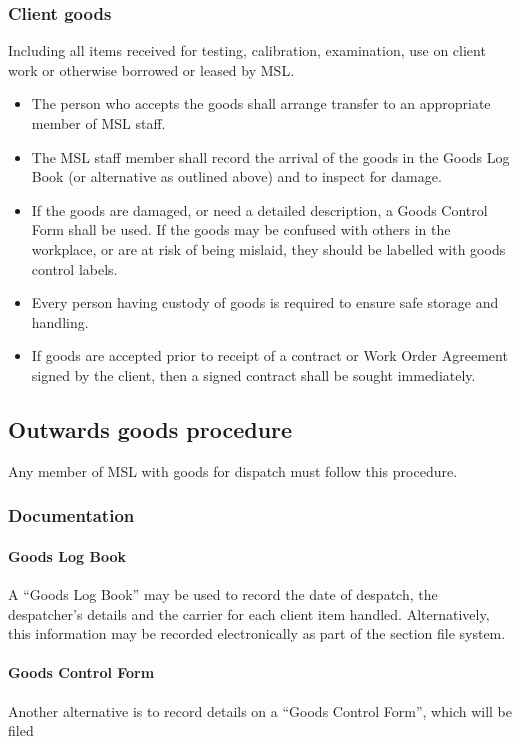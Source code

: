 \subsubsection{Client goods}
Including all items received for testing, calibration, examination, use on client work or otherwise borrowed or leased by MSL. 
\begin{itemize}
\item The person who accepts the goods shall arrange transfer to an appropriate member of MSL staff.
\item The MSL staff member shall record the arrival of the goods in the Goods Log Book (or alternative as outlined above) and to inspect for damage.
\item If the goods are damaged, or need a detailed description, a Goods Control Form shall be used. If the goods may be confused with others in the workplace, or are at risk of being mislaid, they should be labelled with goods control labels. 
\item Every person having custody of goods is required to ensure safe storage and handling. 
\item If goods are accepted prior to receipt of a contract or Work Order Agreement signed by the client, then a signed contract shall be sought immediately.
\end{itemize} 

\subsection{Outwards goods procedure}
Any member of MSL with goods for dispatch must follow this procedure.

\subsubsection{Documentation}
\paragraph{Goods Log Book}
A ``Goods Log Book'' may be used to record the date of despatch, the despatcher's details and the carrier for each client item handled. Alternatively, this information may be recorded electronically as part of the section file system.

\paragraph{Goods Control Form}
Another alternative is to record details on a ``Goods Control Form'', which will be filed  

